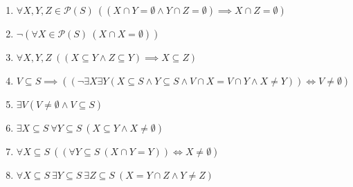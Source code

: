 \documentclass[11pt,a4paper]{article}
\begin{document}
\begin{enumerate}
\item $\displaystyle \forall X, Y, Z \in \mathcal{P}(S)\ ((X \cap Y = \emptyset \land Y \cap Z = \emptyset) \implies X \cap Z = \emptyset)$
\item $\displaystyle \lnot (\forall X \in \mathcal{P}(S)\ (X \cap X = \emptyset))$
\item $\displaystyle \forall X, Y, Z\ ((X \subseteq Y \land Z \subseteq Y) \implies X \subseteq Z)$
\item $\displaystyle V \subseteq S \implies ((\lnot \exists X \exists Y (X \subseteq S \land Y \subseteq S \land V \cap X = V \cap Y \land X \neq Y)) \iff V \neq \emptyset)$
\item $\displaystyle \exists V (V \neq \emptyset \land V \subseteq S)$
\item $\displaystyle \exists X \subseteq S\ \forall Y \subseteq S\ (X \subseteq Y \land X \neq \emptyset)$
\item $\displaystyle \forall X \subseteq S\ ((\forall Y \subseteq S\ (X \cap Y = Y)) \iff X \neq \emptyset)$
\item $\displaystyle \forall X \subseteq S\ \exists Y \subseteq S\ \exists Z \subseteq S\ (X = Y \cap Z \land Y \neq Z)$
\end{enumerate}
\end{document}
